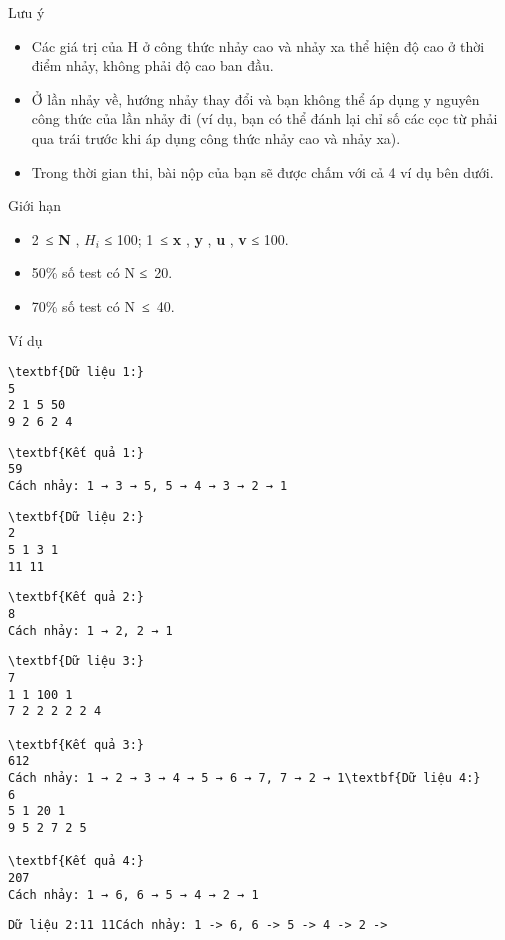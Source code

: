 Lưu ý
\begin{itemize}
	\item     Các giá trị của H ở công thức nhảy cao và nhảy xa thể hiện độ cao ở thời điểm nhảy, không phải độ cao ban đầu.   
	\item     Ở lần nhảy về, hướng nhảy thay đổi và bạn không thể áp dụng y nguyên công thức của lần nhảy đi (ví dụ, bạn có thể đánh lại chỉ số các cọc từ phải qua trái trước khi áp dụng công thức nhảy cao và nhảy xa).   
	\item     Trong thời gian thi, bài nộp của bạn sẽ được chấm với cả 4 ví dụ bên dưới.   
\end{itemize}
Giới hạn
\begin{itemize}
	\item     2 ≤    \textbf{     N    }    ,    \textbf{     $H_{i}$}    ≤ 100; 1 ≤    \textbf{     x    }    ,    \textbf{     y    }    ,    \textbf{     u    }    ,    \textbf{     v    }    ≤ 100.   
	\item     50\% số test có N ≤ 20.   
	\item     70\% số test có N ≤ 40.   
\end{itemize}
Ví dụ
\begin{verbatim}
\textbf{Dữ liệu 1:}
5
2 1 5 50
9 2 6 2 4\end{verbatim}
\begin{verbatim}
\textbf{Kết quả 1:}
59
Cách nhảy: 1 → 3 → 5, 5 → 4 → 3 → 2 → 1\end{verbatim}
\begin{verbatim}
\textbf{Dữ liệu 2:}
2
5 1 3 1
11 11\end{verbatim}
\begin{verbatim}
\textbf{Kết quả 2:}
8
Cách nhảy: 1 → 2, 2 → 1\end{verbatim}
\begin{verbatim}
\textbf{Dữ liệu 3:}
7
1 1 100 1
7 2 2 2 2 2 4

\textbf{Kết quả 3:}
612
Cách nhảy: 1 → 2 → 3 → 4 → 5 → 6 → 7, 7 → 2 → 1\textbf{Dữ liệu 4:}
6
5 1 20 1
9 5 2 7 2 5

\textbf{Kết quả 4:}
207
Cách nhảy: 1 → 6, 6 → 5 → 4 → 2 → 1\end{verbatim}
\begin{verbatim}
Dữ liệu 2:11 11Cách nhảy: 1 -> 6, 6 -> 5 -> 4 -> 2 -> \end{verbatim}